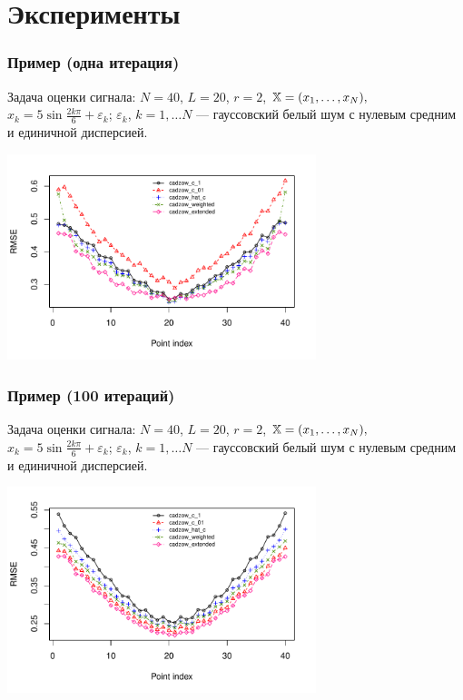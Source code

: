 \documentclass[unicode, notheorems]{beamer}
\begin{document}
\section{Эксперименты}
\begin{frame}
	\frametitle{Пример (одна итерация)}
	Задача оценки сигнала: $N = 40$, $L = 20$, $r = 2$, $\mathbb{X} = (x_{1}, \ldots, x_N),$  $x_k = 5\sin{\frac{2 k \pi}{6}} + \varepsilon_k$; $\varepsilon_k$, $k = 1, \ldots N$ --- гауссовский белый шум с нулевым средним и единичной дисперсией.
	\vspace{-0.3cm}
	\begin{center}
		\includegraphics*[width = 9cm]{s1_it1.pdf}
	\end{center}
\end{frame}

\begin{frame}
	\frametitle{Пример (100 итераций)}
	Задача оценки сигнала: $N = 40$, $L = 20$, $r = 2$, $\mathbb{X} = (x_{1}, \ldots, x_N),$  $x_k = 5\sin{\frac{2 k \pi}{6}} + \varepsilon_k$; $\varepsilon_k$, $k = 1, \ldots N$ --- гауссовский белый шум с нулевым средним и единичной дисперсией.
	\vspace{-0.3cm}
	
	\begin{center}
		\includegraphics*[width = 9cm]{s1_it100.pdf}
	\end{center}
\end{frame}
\end{document}
